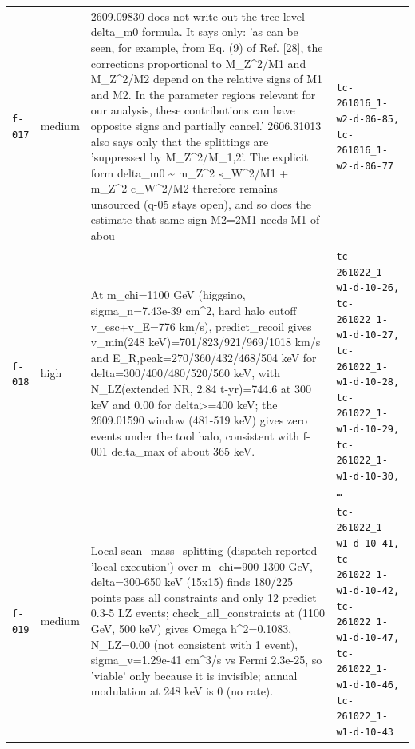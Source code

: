 \documentclass[11pt,a4paper]{article}
\begin{document}
\begin{longtable}{@{}p{}p{}p{}p{}@{}}
\texttt{f-017} & medium & 2609.09830 does not write out the tree-level delta\_m0 formula. It says only: 'as can be seen, for example, from Eq. (9) of Ref. [28], the corrections proportional to M\_Z\textasciicircum{}2/M1 and M\_Z\textasciicircum{}2/M2 depend on the relative signs of M1 and M2. In the parameter regions relevant for our analysis, these contributions can have opposite signs and partially cancel.' 2606.31013 also says only that the splittings are 'suppressed by M\_Z\textasciicircum{}2/M\_1,2'. The explicit form delta\_m0 \textasciitilde{} m\_Z\textasciicircum{}2 s\_W\textasciicircum{}2/M1 + m\_Z\textasciicircum{}2 c\_W\textasciicircum{}2/M2 therefore remains unsourced (q-05 stays open), and so does the estimate that same-sign M2=2M1 needs M1 of abou & \texttt{tc-261016\_\allowbreak{}1-w2-d-06-85,\allowbreak{} tc-261016\_\allowbreak{}1-w2-d-06-77} \\
\texttt{f-018} & high & At m\_chi=1100 GeV (higgsino, sigma\_n=7.43e-39 cm\textasciicircum{}2, hard halo cutoff v\_esc+v\_E=776 km/s), predict\_recoil gives v\_min(248 keV)=701/823/921/969/1018 km/s and E\_R,peak=270/360/432/468/504 keV for delta=300/400/480/520/560 keV, with N\_LZ(extended NR, 2.84 t-yr)=744.6 at 300 keV and 0.00 for delta\textgreater{}=400 keV; the 2609.01590 window (481-519 keV) gives zero events under the tool halo, consistent with f-001 delta\_max of about 365 keV. & \texttt{tc-261022\_\allowbreak{}1-w1-d-10-26,\allowbreak{} tc-261022\_\allowbreak{}1-w1-d-10-27,\allowbreak{} tc-261022\_\allowbreak{}1-w1-d-10-28,\allowbreak{} tc-261022\_\allowbreak{}1-w1-d-10-29,\allowbreak{} tc-261022\_\allowbreak{}1-w1-d-10-30,\allowbreak{} \ldots{}\allowbreak{}} \\
\texttt{f-019} & medium & Local scan\_mass\_splitting (dispatch reported 'local execution') over m\_chi=900-1300 GeV, delta=300-650 keV (15x15) finds 180/225 points pass all constraints and only 12 predict 0.3-5 LZ events; check\_all\_constraints at (1100 GeV, 500 keV) gives Omega h\textasciicircum{}2=0.1083, N\_LZ=0.00 (not consistent with 1 event), sigma\_v=1.29e-41 cm\textasciicircum{}3/s vs Fermi 2.3e-25, so 'viable' only because it is invisible; annual modulation at 248 keV is 0 (no rate). & \texttt{tc-261022\_\allowbreak{}1-w1-d-10-41,\allowbreak{} tc-261022\_\allowbreak{}1-w1-d-10-42,\allowbreak{} tc-261022\_\allowbreak{}1-w1-d-10-47,\allowbreak{} tc-261022\_\allowbreak{}1-w1-d-10-46,\allowbreak{} tc-261022\_\allowbreak{}1-w1-d-10-43} \\

\end{longtable}
\end{document}
